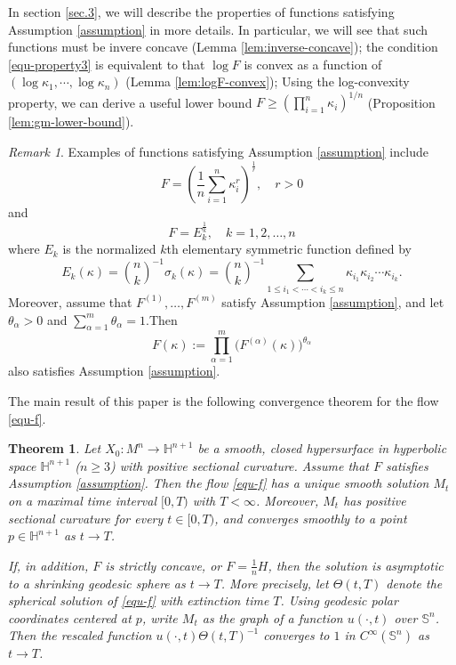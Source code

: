 \documentclass[11pt,reqno]{amsart}
\newtheorem{theorem}[proposition]{Theorem}
\theoremstyle{remark}
\newtheorem{remark}[proposition]{Remark}
\numberwithin{equation}{section}
\begin{document}
In section \ref{sec.3}, we will describe the properties of functions satisfying Assumption \ref{assumption} in more details. In particular, we will see that such functions must be invere concave (Lemma \ref{lem:inverse-concave}); the condition \eqref{equ-property3} is equivalent to that $\log F$ is convex as a function of $(\log \kappa_1,\cdots,\log\kappa_n)$ (Lemma \ref{lem:logF-convex}); Using the log-convexity property, we can derive a useful lower bound $F\geq \left(\prod_{i=1}^n \kappa_i\right)^{1/n}$ (Proposition \ref{lem:gm-lower-bound}).  
\begin{remark}
Examples of functions satisfying Assumption \ref{assumption} include 
\[F=\left(\frac{1}{n}\sum_{i=1}^n \kappa_i^r\right)^{\frac{1}{r}},\quad r>0\]
and 
\[F=E_k^{\frac{1}{k}},\quad k=1,2,\dots,n\] 
where $E_k$ is the normalized $k$th elementary symmetric function defined by
\begin{equation*}
			E_k(\kappa) = {n\choose k}^{-1}\sigma_k(\kappa) = {n\choose k}^{-1}\sum\limits_{1\leq i_1 <\cdots < i_k \leq n} \kappa_{i_1}\kappa_{i_2}\cdots\kappa_{i_k}.
\end{equation*}
Moreover, assume that $F^{(1)},\dots,F^{(m)}$ satisfy Assumption \ref{assumption}, and let $\theta_\alpha>0$ and $\sum_{\alpha=1}^m \theta_\alpha=1$.Then
\[
F(\kappa):=\prod_{\alpha=1}^m \big(F^{(\alpha)}(\kappa)\big)^{\theta_\alpha}
\]
also satisfies Assumption \ref{assumption}.
\end{remark}

The main result of this paper is the following convergence theorem for the flow \eqref{equ-f}.

\begin{theorem}\label{thm-main}
	Let $X_0:M^n \to \mathbb{H}^{n+1}$ be a smooth, closed hypersurface in hyperbolic space $\mathbb{H}^{n+1}$ ($n\geq 3$) with positive sectional curvature. Assume that $F$ satisfies Assumption \ref{assumption}. Then the flow \eqref{equ-f} has a unique smooth solution $M_t$ on a maximal time interval $[0,T)$ with $T<\infty$. Moreover, $M_t$ has positive sectional curvature for every $t\in[0,T)$, and converges smoothly to a point $p\in\mathbb{H}^{n+1}$ as $t\to T$.
    
	If, in addition, $F$ is strictly concave, or $F=\frac{1}{n}H$, then the solution is asymptotic to a shrinking geodesic sphere as $t\to T$. More precisely, let $\Theta(t,T)$ denote the spherical solution of \eqref{equ-f} with extinction time $T$. Using geodesic polar coordinates centered at $p$, write $M_t$ as the graph of a function $u(\cdot,t)$ over $\mathbb{S}^n$. Then the rescaled function $u(\cdot,t)\Theta(t,T)^{-1}$ converges to $1$ in $C^\infty(\mathbb{S}^n)$ as $t\to T$. 
\end{theorem}
\end{document}
